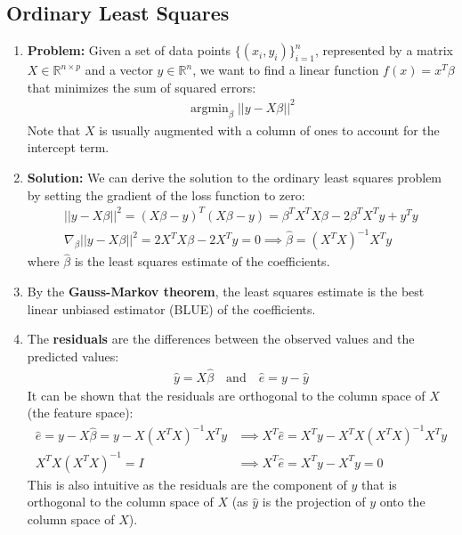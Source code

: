 \documentclass[letterpaper, 11pt]{article}
\newcommand{\R}{\mathbb{R}}	%
\newcommand{\1}{\mathds{1}}	%
\DeclareMathOperator*{\argmin}{argmin}		%
\theoremstyle{definition}
\begin{document}
\subsection{Ordinary Least Squares}
\begin{enumerate}
    \item \textbf{Problem:} Given a set of data points $\{(x_i, y_i)\}_{i=1}^{n}$, represented by a matrix $X \in \R^{n \times p}$ and a vector $y \in \R^n$, we want to find 
    a linear function $f(x) = x^T \beta$ that minimizes the sum of squared errors:
    \begin{align}
        \argmin_{\beta} ||y - X \beta||^2
    \end{align}
    Note that $X$ is usually augmented with a column of ones to account for the intercept term.
    \item \textbf{Solution:} We can derive the solution to the ordinary least squares problem by setting the gradient of the loss function to zero:
    \begin{align}
        ||y - X \beta||^2 = (X\beta - y)^T(X\beta - y) = \beta^T X^T X \beta - 2 \beta^T X^T y + y^T y \\
        \nabla_{\beta} ||y - X \beta||^2 = 2 X^T X \beta - 2 X^T y = 0 \implies \hat{\beta} = (X^T X)^{-1} X^T y
    \end{align}
    where $\hat{\beta}$ is the least squares estimate of the coefficients.
    \item By the \textbf{Gauss-Markov theorem}, the least squares estimate is the best linear unbiased estimator (BLUE) of the coefficients.
    \item The \textbf{residuals} are the differences between the observed values and the predicted values:
    \begin{align}
        \hat{y} = X \hat{\beta} \quad \text{and} \quad \hat{e}  = y - \hat{y}
    \end{align}
    It can be shown that the residuals are orthogonal to the column space of $X$ (the feature space):
    \begin{align}
        \hat{e} = y - X \hat{\beta} = y - X (X^T X)^{-1} X^T y &\implies X^T \hat{e} = X^T y - X^T X (X^T X)^{-1} X^T y \\
        X^T X (X^T X)^{-1} = I &\implies X^T \hat{e} = X^T y - X^T y = 0
    \end{align}
    This is also intuitive as the residuals are the component of $y$ that is orthogonal to the column space of $X$ (as $\hat{y}$ 
    is the projection of $y$ onto the column space of $X$). \\ \\ 

\end{enumerate}
\end{document}
